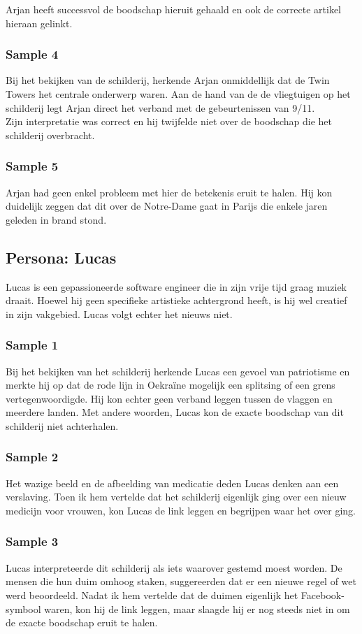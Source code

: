 Arjan heeft successvol de boodschap hieruit gehaald en ook de correcte artikel hieraan gelinkt. 

\subsubsection{Sample 4}
Bij het bekijken van de schilderij, herkende Arjan onmiddellijk dat de Twin Towers het centrale onderwerp waren. Aan de hand van de de vliegtuigen op het schilderij legt Arjan direct het verband met de gebeurtenissen van 9/11. \\

 Zijn interpretatie was correct en hij twijfelde niet over de boodschap die het schilderij overbracht.

\subsubsection{Sample 5}
Arjan had geen enkel probleem met hier de betekenis eruit te halen. Hij kon duidelijk zeggen dat dit over de Notre-Dame gaat in Parijs die enkele jaren geleden in brand stond. 

\subsection{Persona: Lucas}
Lucas is een gepassioneerde software engineer die in zijn vrije tijd graag muziek draait. Hoewel hij geen specifieke artistieke achtergrond heeft, is hij wel creatief in zijn vakgebied. Lucas volgt echter het nieuws niet.
\subsubsection{Sample 1}
Bij het bekijken van het schilderij herkende Lucas een gevoel van patriotisme en merkte hij op dat de rode lijn in Oekraïne mogelijk een splitsing of een grens vertegenwoordigde. Hij kon echter geen verband leggen tussen de vlaggen en meerdere landen. Met andere woorden, Lucas kon de exacte boodschap van dit schilderij niet achterhalen.
\subsubsection{Sample 2}
Het wazige beeld en de afbeelding van medicatie deden Lucas denken aan een verslaving. Toen ik hem vertelde dat het schilderij eigenlijk ging over een nieuw medicijn voor vrouwen, kon Lucas de link leggen en begrijpen waar het over ging.
\subsubsection{Sample 3}
Lucas interpreteerde dit schilderij als iets waarover gestemd moest worden. De mensen die hun duim omhoog staken, suggereerden dat er een nieuwe regel of wet werd beoordeeld. Nadat ik hem vertelde dat de duimen eigenlijk het Facebook-symbool waren, kon hij de link leggen, maar slaagde hij er nog steeds niet in om de exacte boodschap eruit te halen.
